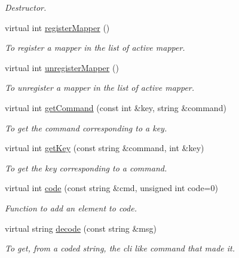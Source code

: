 \begin{DoxyCompactItemize}
\begin{DoxyCompactList}\small\item\em Destructor. \item\end{DoxyCompactList}\item 
virtual int \hyperlink{classTMSMapper_a80861ce29842aea1375efc77cb093a17}{registerMapper} ()
\begin{DoxyCompactList}\small\item\em To register a mapper in the list of active mapper. \item\end{DoxyCompactList}\item 
virtual int \hyperlink{classTMSMapper_a0780bd57fb6ddcbf4b2b9002370d307f}{unregisterMapper} ()
\begin{DoxyCompactList}\small\item\em To unregister a mapper in the list of active mapper. \item\end{DoxyCompactList}\item 
virtual int \hyperlink{classTMSMapper_a4c101d1620d544eaa7e42c364878c6aa}{getCommand} (const int \&key, string \&command)
\begin{DoxyCompactList}\small\item\em To get the command corresponding to a key. \item\end{DoxyCompactList}\item 
virtual int \hyperlink{classTMSMapper_a943adb719ff984d5f6d9864850c3ad9d}{getKey} (const string \&command, int \&key)
\begin{DoxyCompactList}\small\item\em To get the key corresponding to a command. \item\end{DoxyCompactList}\item 
virtual int \hyperlink{classTMSMapper_aae46d8055ecfe88e485be237a37f1f24}{code} (const string \&cmd, unsigned int code=0)
\begin{DoxyCompactList}\small\item\em Function to add an element to code. \item\end{DoxyCompactList}\item 
virtual string \hyperlink{classTMSMapper_accb3c964a3f3cb147d1678d0efaeabb0}{decode} (const string \&msg)
\begin{DoxyCompactList}\small\item\em To get, from a coded string, the cli like command that made it. \item\end{DoxyCompactList}\end{DoxyCompactItemize}
